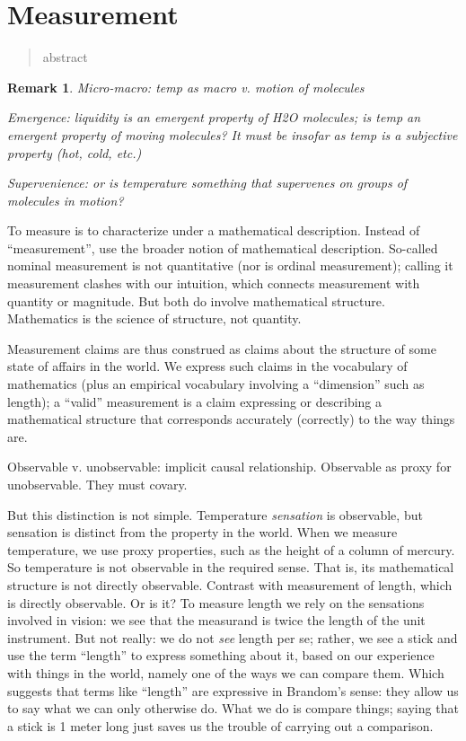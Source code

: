 \documentclass[11pt,twoside]{article}
\newtheorem{remark}{Remark}
\begin{document}
\clearpage
\section{Measurement}

\begin{abstract}
abstract
\end{abstract}

\begin{remark}

Micro-macro:  temp as macro v. motion of molecules

Emergence: liquidity is an emergent property of H2O molecules; is temp
an emergent property of moving molecules?  It must be insofar as temp
is a subjective property (hot, cold, etc.)

Supervenience: or is temperature something that supervenes on groups
of molecules in motion?

\end{remark}

To measure is to characterize under a mathematical description.
Instead of ``measurement'', use the broader notion of mathematical
description.  So-called nominal measurement is not quantitative (nor
is ordinal measurement); calling it measurement clashes with our
intuition, which connects measurement with quantity or magnitude.  But
both do involve mathematical structure.  Mathematics is the science of
structure, not quantity.

Measurement claims are thus construed as claims about the structure of
some state of affairs in the world.  We express such claims in the
vocabulary of mathematics (plus an empirical vocabulary involving a
``dimension'' such as length); a ``valid'' measurement is a claim
expressing or describing a mathematical structure that corresponds
accurately (correctly) to the way things are.

Observable v. unobservable: implicit causal relationship.  Observable
as proxy for unobservable.  They must covary.

But this distinction is not simple.  Temperature \textit{sensation} is
observable, but sensation is distinct from the property in the world.
When we measure temperature, we use proxy properties, such as the
height of a column of mercury.  So temperature is not observable in
the required sense.  That is, its mathematical structure is not
directly observable.  Contrast with measurement of length, which is
directly observable.  Or is it?  To measure length we rely on the
sensations involved in vision: we see that the measurand is twice the
length of the unit instrument.  But not really: we do not \textit{see}
length per se; rather, we see a stick and use the term ``length'' to
express something about it, based on our experience with things in the
world, namely one of the ways we can compare them.  Which suggests
that terms like ``length'' are expressive in Brandom's sense: they
allow us to say what we can only otherwise do.  What we do is compare
things; saying that a stick is 1 meter long just saves us the trouble
of carrying out a comparison.
\end{document}
